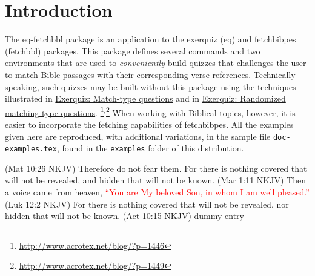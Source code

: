 \documentclass{article}
\let\pkg\textsf
\begin{document}
\maketitle

\tableofcontents
{}

\section{Introduction}

The \pkg{eq-fetchbbl} package is an application to the \pkg{exerquiz} (eq)
and \pkg{fetchbibpes} (fetchbbl) packages. This package defines several
commands and two environments that are used to \emph{conveniently} build
quizzes that challenges the user to match Bible passages with their
corresponding verse references. Technically speaking, such quizzes may be
built without this package using the techniques illustrated in
\textsf{\href{http://www.acrotex.net/blog/?p=1446}{Exerquiz: Match-type
questions}} and in
\textsf{\href{http://www.acrotex.net/blog/?p=1449}{Exerquiz: Randomized
matching-type questions}}.\relax
\footnote{\url{http://www.acrotex.net/blog/?p=1446}}\ensuremath{{}^{\text{,}}}\footnote
{\url{http://www.acrotex.net/blog/?p=1449}} When working with Biblical
topics, however, it is easier to incorporate the fetching capabilities of
\pkg{fetchbibpes}. All the examples given here are reproduced, with
additional variations, in the sample file \texttt{doc-examples.tex}, found in
the \texttt{examples} folder of this distribution.

\begin{declareBVs*}
\BV(Mat 10:26 NKJV) Therefore do not fear them. For there is nothing covered that will not be
    revealed, and hidden that will not be known.\null
\BV(Mar 1:11 NKJV) Then a voice came from heaven, \textcolor{red}{``You are My beloved Son, in whom I am well
    pleased.''}\null
\BV(Luk 12:2 NKJV) For there is nothing covered that will not be revealed, nor hidden that
    will not be known.\null
\BV(Act 10:15 NKJV) dummy entry\null
\end{declareBVs*}
\end{document}
